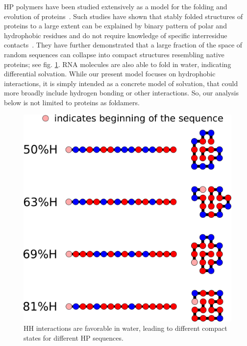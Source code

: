 \documentclass[journal=jacsat,manuscript=article,layout=twocolumn]{achemso}
\begin{document}
HP polymers have been studied extensively as a model for the folding and 
evolution of proteins~\cite{lau1989lattice,Chan1991,Miller1995,Yue1995,agarwala1997local}.  Such 
studies have shown that stably folded structures of proteins to a large extent can be explained by 
binary pattern of polar and hydrophobic residues and do not require knowledge of specific 
interresidue contacts~\cite{Yue1992,Xiong1995,Fisher2011}. They have further demonstrated that 
a large fraction of the space of random sequences can 
collapse into compact structures resembling native proteins\cite{lau1989lattice}; see fig. 
\ref{fig:hydro-effect}.  RNA molecules are also able to fold in water, indicating differential 
solvation.  While our present model focuses on hydrophobic interactions, it is simply intended as a 
concrete model of solvation, that could more broadly include hydrogen bonding or other interactions. 
 So, our analysis below is not limited to proteins as foldamers.

\begin{figure}[h!]
  \centering
  \includegraphics[width=\columnwidth]{pictures/tst-seqs.pdf} 
  \caption{\footnotesize{HH interactions are favorable in water, leading to different 
compact states for different 
HP sequences.}}
  \label{fig:hydro-effect}
\end{figure}
\end{document}
